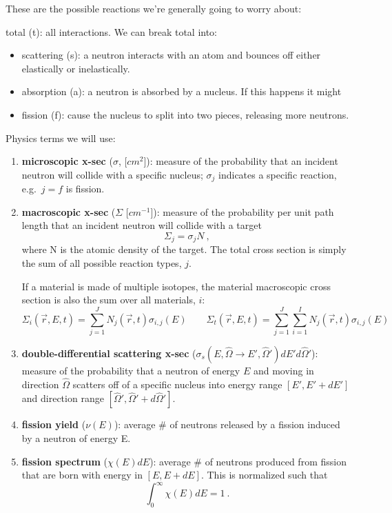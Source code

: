 \documentclass[12pt]{article}
\newcommand{\vOmega}{\ensuremath{\hat{\Omega}}}
\begin{document}
These are the possible reactions we're generally going to worry about:

\hspace*{1em}total (t): all interactions. We can break total into:
\begin{itemize}
\item scattering (s): a neutron interacts with an atom and bounces off either elastically or inelastically.
\item absorption (a): a neutron is absorbed by a nucleus. If this happens it might
\item fission (f): cause the nucleus to split into two pieces, releasing more neutrons.
\end{itemize}

Physics terms we will use:
\begin{enumerate}
\item \textbf{microscopic x-sec} ($\sigma$, [$cm^2$]): measure of the probability that an incident neutron will collide with a specific nucleus; $\sigma_j$ indicates a specific reaction, e.g.\ $j=f$ is fission.

\item \textbf{macroscopic x-sec} ($\Sigma$ [$cm^{-1}$]): measure of the probability per unit path length that an incident neutron will collide with a target
\[\Sigma_j = \sigma_j N\:,\]
where N is the atomic density of the target. The total cross section is simply the sum of all possible reaction types, $j$. 

If a material is made of multiple isotopes, the material macroscopic cross section is also the sum over all materials, $i$:
\[
\Sigma_i(\vec{r}, E, t) = \sum_{j=1}^J  N_j(\vec{r}, t)\sigma_{i,j}(E)
\qquad
\Sigma_t(\vec{r}, E, t) = \sum_{j=1}^J \sum_{i=1}^I N_j(\vec{r}, t)\sigma_{i,j}(E)
\]

\item \textbf{double-differential scattering x-sec} ($\sigma_s(E, \vOmega \rightarrow E', \vOmega')dE' d\vOmega'$): measure of the probability that a neutron of energy $E$ and moving in direction $\vOmega$ scatters off of a specific nucleus into energy range $[E', E' + dE']$ and direction range $[\vOmega', \vOmega' + d\vOmega']$.

\item \textbf{fission yield} ($\nu(E)$): average \# of neutrons released by a fission induced by a neutron of energy E.

\item \textbf{fission spectrum} ($\chi(E)dE$): average \# of neutrons produced from fission that are born with energy in $[E, E + dE]$. This is normalized such that
\[\int_0^{\infty} \chi(E)dE =1\:.\]



\end{enumerate}
\end{document}

